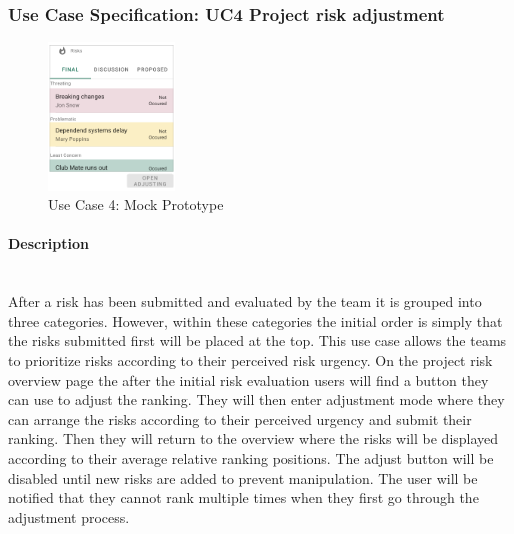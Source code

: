 \newpage
\subsubsection{Use Case Specification: \ac{UC}4 Project risk adjustment}
\label{sec:domainBbe}

\begin{figure}
	\includegraphics[width=0.3\textwidth]{Assets/UC_Screenshots/UC4S.png}
	\caption{Use Case 4: Mock Prototype}
	\label{fig:useCase4Detail}
\end{figure}

\paragraph*{Description}\mbox{}\\
After a risk has been submitted and evaluated by the team it is grouped into three categories. However, within these categories the initial order is simply that the risks submitted first will be placed at the top. This use case allows the teams to prioritize risks according to their perceived risk urgency. On the project risk overview page the after the initial risk evaluation users will find a button they can use to adjust the ranking. They will then enter adjustment mode where they can arrange the risks according to their perceived urgency and submit their ranking. Then they will return to the overview where the risks will be displayed according to their average relative ranking positions. The adjust button will be disabled until new risks are added to prevent manipulation. The user will be notified that they cannot rank multiple times when they first go through the adjustment process. 

